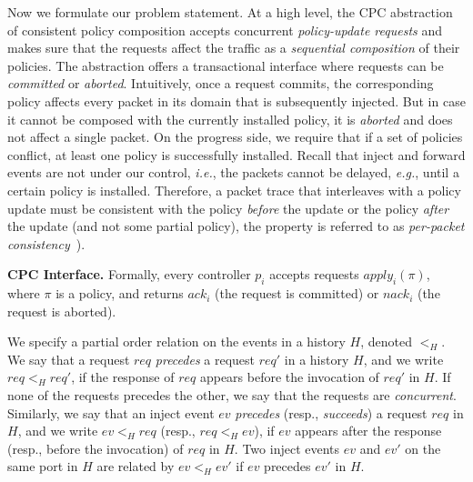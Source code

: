 \documentclass[11pt,pdftex,letter]{article}
\newcommand{\eg}{{\it e.g.}}
\newcommand{\ie}{{\it i.e.}}
\newcommand{\mcnote}[1]{\textcolor{heraldBlue}{\small \bf [MC: #1]}}
\newcommand{\ssnote}[1]{\textcolor{heraldBlue}{\small \bf [SS: #1]}}
\newcommand{\pknote}[1]{\textcolor{heraldBlue}{\small \bf [PK: #1]}}
\newcommand{\mcnote}[1]{}
\newcommand{\ssnote}[1]{}
\newcommand{\pknote}[1]{}
\newcommand{\ack}{\textit{ack}}
\newcommand{\nack}{\textit{nack}}
\begin{document}
Now we formulate our problem statement.
At a high level, the CPC abstraction of consistent policy composition
accepts concurrent \emph{policy-update requests} and makes sure that
the requests affect the traffic as a \emph{sequential composition} of
their policies.
The abstraction offers a transactional interface
where requests can be \emph{committed} or \emph{aborted}.
Intuitively, once a request commits, the corresponding policy
affects every packet in its
domain that is subsequently injected.
But in case it cannot be composed with the currently
installed policy, it is \emph{aborted} and does not affect a
single packet. On the progress side, we require that if a set of policies conflict, at least one
policy is successfully installed.
Recall that inject and forward events are not under our control, \ie, the packets cannot
be delayed, \eg, until a certain policy is installed.
Therefore, a packet trace that interleaves with a policy update
must be consistent with the policy \emph{before} the update or the policy \emph{after}
the update (and not some partial policy), the property is
referred to as \emph{per-packet consistency}~\cite{network-update}). 

\vspace{1mm}\noindent\textbf{CPC Interface.}
Formally, every controller $p_i$ accepts requests
$\textit{apply}_i(\pi)$, where $\pi$ is a policy,
and returns $\ack_{i}$ (the request is committed) or $\nack_{i}$
(the request is aborted).

We specify a partial order relation on the events in a history $H$,
denoted $<_H$.
We say that a request $\textit{req}$ \emph{precedes} a request
$\textit{req}'$ in a history $H$, and we write $\textit{req} <_H
\textit{req}'$, if the response of
$\textit{req}$ appears before the invocation of $\textit{req}'$ in $H$.
If none of the requests precedes the other, we say that the requests
are \emph{concurrent}.
Similarly, we say that an inject event $ev$ \emph{precedes} (resp.,
\emph{succeeds}) a request $\textit{req}$ in $H$, and we write $ev <_H
\textit{req}$ (resp., $\textit{req} <_H ev$),  if $ev$ appears after the
response (resp., before  the invocation) of
$\textit{req}$ in $H$.
Two inject events $ev$ and $ev'$ on the same port in $H$
are related by $ev <_H ev'$ if
$ev$ precedes $ev'$ in $H$.
\end{document}
